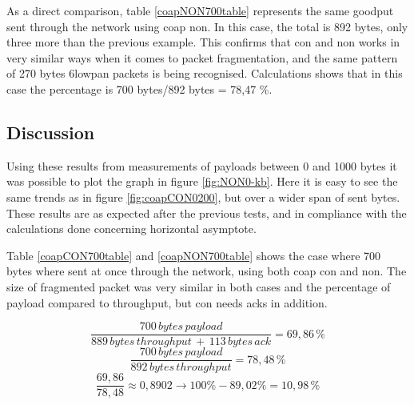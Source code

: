 \noindent As a direct comparison, table \ref{coapNON700table} represents the same \gls{goodput} sent through the network using \gls{coap} \gls{non}. In this case, the total is 892 bytes, only three more than the previous example. This confirms that \gls{con} and \gls{non} works in very similar ways when it comes to packet fragmentation, and the same pattern of 270 bytes \gls{6lowpan} packets is being recognised. Calculations shows that in this case the percentage is 700 bytes/892 bytes = 78,47 \%. 



\subsection{Discussion}

\noindent Using these results from measurements of \glspl{payload} between 0 and 1000 bytes it was possible to plot the graph in figure \ref{fig:NON0-kb}. Here it is easy to see the same trends as in figure \ref{fig:coapCON0200}, but over a wider span of sent bytes. These results are as expected after the previous tests, and in compliance with the calculations done concerning horizontal asymptote.  


\noindent Table \ref{coapCON700table} and \ref{coapNON700table} shows the case where 700 bytes where sent at once through the network, using both \gls{coap} \gls{con} and \gls{non}. The size of fragmented packet was very similar in both cases and the percentage of \gls{payload} compared to \gls{throughput}, but \gls{con} needs \glspl{ack} in addition. 

\begin{equation} \label{lessThanHAlfAPercentCalculation}
	\frac{700 \, bytes \, payload}{889 \, bytes \, throughput \, + \, 113 \, bytes \, ack} = 69,86 \,\%
\end{equation}
\begin{equation} \label{lessThanHAlfAPercentCalculation2}
	\frac{700 \, bytes \, payload}{892 \, bytes \, throughput} = 78,48 \,\%
\end{equation}	
\begin{equation} \label{lessThanHAlfAPercentCalculation3}	
    \frac{69,86}{78,48} \approx 0,8902  \rightarrow 100 \% - 89,02 \% = 10,98 \,\%
\end{equation}

